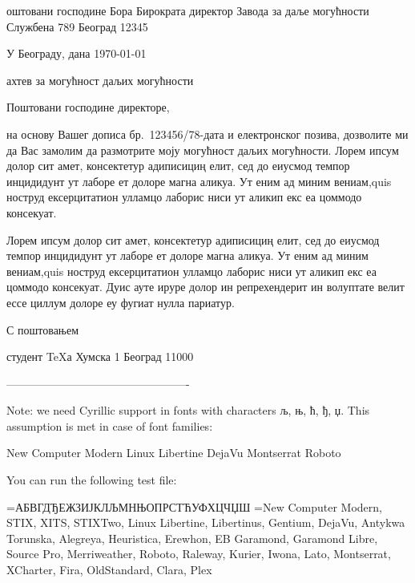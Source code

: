 
\fontfam[DejaVu]
\srclang

\address
  Поштовани господине
  Бора Бирократа
  директор Завода за даље могућности
  Службена 789
  Београд 12345

\hfill У Београду, дана \today

\subject Захтев за могућност даљих могућности

Поштовани господине директоре,

на основу Вашег дописа бр.~123456/78-дата и електронског позива, дозволите ми 
да Вас замолим да размотрите моју могућност даљих могућности.
Лорем ипсум долор сит амет, консектетур адиписициң елит, сед до
еиусмод темпор инцидидунт ут лаборе ет долоре магна аликуа. Ут еним ад миним
вениам,quis ноструд ексерцитатион улламцо лаборис ниси ут аликип екс еа
цоммодо консекуат.

Лорем ипсум долор сит амет, консектетур адиписициң елит, сед до
еиусмод темпор инцидидунт ут лаборе ет долоре магна аликуа. Ут еним ад миним
вениам,quis ноструд ексерцитатион улламцо лаборис ниси ут аликип екс еа
цоммодо консекуат. Дуис ауте ируре долор ин репрехендерит ин волуптате велит
ессе циллум долоре еу фугиат нулла париатур.

С поштовањем

\hfill \address
  {\it Вук Ђукановић}
  студент \TeX а
  Хумска 1
  Београд 11000

\bye

-------------------------------------------------

Note: we need Cyrillic support in fonts with characters љ, њ, ћ, ђ, џ.
This assumption is met in case of font families:

   New Computer Modern
   Linux Libertine
   DejaVu
   Montserrat
   Roboto

You can run the following test file:

\catalogsample={АБВГДЂЕЖЗИЈКЛЉМНЊОПРСТЋУФХЦЧЏШ}
\catalogonly={New Computer Modern, STIX, XITS, STIXTwo, Linux Libertine, Libertinus, Gentium, DejaVu,%
    Antykwa Torunska, Alegreya, Heuristica, Erewhon, EB Garamond, Garamond Libre, Source Pro,%
    Merriweather, Roboto, Raleway, Kurier, Iwona, Lato, Montserrat, XCharter, Fira, OldStandard, Clara, Plex%
}
\fontfam [Catalogue]

